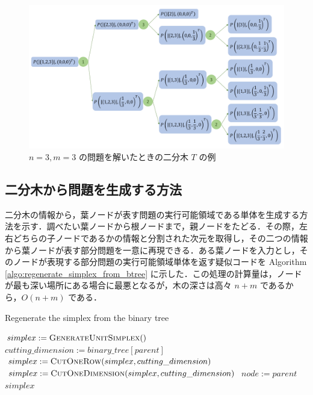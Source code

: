 \documentclass[a4paper,11pt]{jreport}
\begin{document}
\begin{figure}
\begin{center}
\includegraphics[width=17cm]{graphs/simplex_tree.pdf}
\caption{$ n = 3, m = 3 $ の問題を解いたときの二分木 $ T $ の例}
\label{fig:simplex_tree}
\end{center}
\end{figure}

\subsection{二分木から問題を生成する方法} \label{sec:generate_problem_from_btree}

二分木の情報から，葉ノードが表す問題の実行可能領域である単体を生成する方法を示す．調べたい葉ノードから根ノードまで，親ノードをたどる．その際，左右どちらの子ノードであるかの情報と分割された次元を取得し，その二つの情報から葉ノードが表す部分問題を一意に再現できる．ある葉ノードを入力とし，そのノードが表現する部分問題の実行可能領域単体を返す疑似コードを Algorithm \ref{algo:regenerate_simplex_from_btree} に示した．この処理の計算量は，ノードが最も深い場所にある場合に最悪となるが，木の深さは高々 $ n + m $ であるから，$ O(n + m) $ である．\par

\begin{algorithm}
\caption{Regenerate the simplex from the binary tree}
\label{algo:regenerate_simplex_from_btree}
\begin{algorithmic}[1]
\State $ simplex := \Call{GenerateUnitSimplex} $
\State $ cutting\_dimension := binary\_tree[parent] $
\State $ simplex := \Call{CutOneRow}{simplex, cutting\_dimension} $
\State $ simplex := \Call{CutOneDimension}{simplex,  cutting\_dimension} $
\EndIf
\State $ node := parent $
\EndWhile
\State \Return $ simplex $
\EndFunction
\end{algorithmic}
\end{algorithm}
\end{document}
